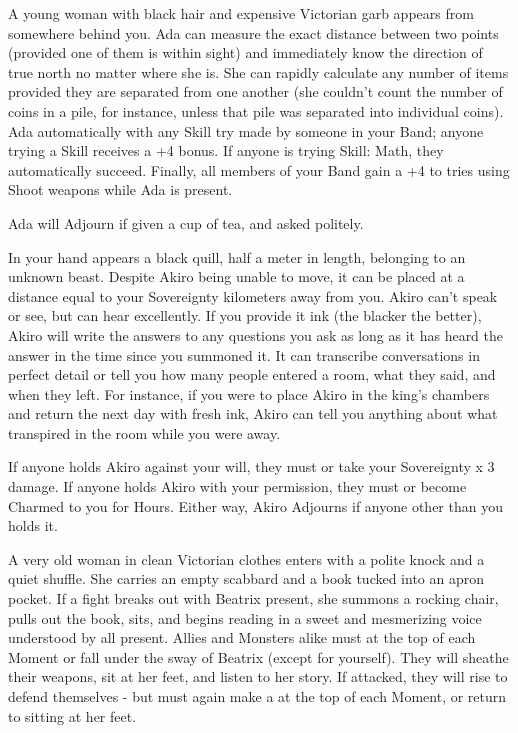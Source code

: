 A young woman with black hair and expensive Victorian garb appears from somewhere behind you.  Ada can measure the exact distance between two points (provided one of them is within sight) and immediately know the direction of true north no matter where she is.  She can rapidly calculate any number of items provided they are separated from one another (she couldn't count the number of coins in a pile, for instance, unless that pile was separated into individual coins).  Ada automatically  with any Skill try made by someone in your Band; anyone trying a Skill receives a +4 bonus. If anyone is trying Skill: Math, they automatically succeed.  Finally, all members of your Band gain a +4 to \RO tries using Shoot weapons while Ada is present.

Ada will Adjourn if given a cup of tea, and asked politely.


In your hand appears a black quill, half a meter in length, belonging to an unknown beast. Despite Akiro being unable to move, it can be placed at a distance equal to your Sovereignty kilometers away from you. Akiro can't speak or see, but can hear excellently.  If you provide it ink (the blacker the better), Akiro will write the answers to any questions you ask as long as it has heard the answer in the time since you summoned it.  It can transcribe conversations in perfect detail or tell you how many people entered a room, what they said, and when they left.  For instance, if you were to place Akiro in the king's chambers and return the next day with fresh ink, Akiro can tell you anything about what transpired in the room while you were away.

If anyone holds Akiro against your will, they must  or take your Sovereignty x 3 damage.  If anyone holds Akiro with your permission, they must  or become Charmed to you for Hours.  Either way, Akiro Adjourns if anyone other than you holds it.




A very old woman in clean Victorian clothes enters with a polite knock and a quiet shuffle.  She carries an empty scabbard and a book tucked into an apron pocket.  If a fight breaks out with Beatrix present, she summons a rocking chair, pulls out the book, sits, and begins reading in a sweet and mesmerizing voice understood by all present.  Allies and Monsters alike must  at the top of each Moment or fall under the sway of Beatrix (except for yourself).  They will sheathe their weapons, sit at her feet, and listen to her story. If attacked, they will rise to defend themselves - but must again make a  at the top of each Moment, or return to sitting at her feet.

